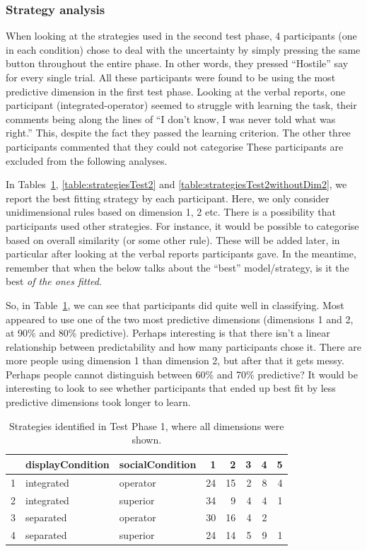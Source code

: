\documentclass[doc, a4paper, apacite]{apa6}
\begin{document}
\subsubsection{Strategy analysis}

When looking at the strategies used in the second test phase, 4 participants (one in each condition) chose to deal with the uncertainty by simply pressing the same button throughout the entire phase.
In other words, they pressed ``Hostile'' say for every single trial.
All these participants were found to be using the most predictive dimension in the first test phase. 
Looking at the verbal reports, one participant (integrated-operator) seemed to struggle with learning the task, their comments being along the lines of ``I don't know, I was never told what was right.''
This, despite the fact they passed the learning criterion. 
The other three participants commented that they could not categorise 
These participants are excluded from the following analyses. 

In Tables~\ref{table:strategiesTest1}, \ref{table:strategiesTest2} and \ref{table:strategiesTest2withoutDim2}, we report the best fitting strategy by each participant. 
Here, we only consider unidimensional rules based on dimension 1, 2 etc. 
There is a possibility that participants used other strategies. 
For instance, it would be possible to categorise based on overall similarity (or some other rule). 
These will be added later, in particular after looking at the verbal reports participants gave. 
In the meantime, remember that when the below talks about the ``best'' model/strategy, is it the best \emph{of the ones fitted}.

So, in Table~\ref{table:strategiesTest1}, we can see that participants did quite well in classifying. 
Most appeared to use one of the two most predictive dimensions (dimensions 1 and 2, at 90\% and 80\% predictive). 
Perhaps interesting is that there isn't a linear relationship between predictability and how many participants chose it. 
There are more people using dimension 1 than dimension 2, but after that it gets messy. 
Perhaps people cannot distinguish between 60\% and 70\% predictive? 
It would be interesting to look to see whether participants that ended up best fit by less predictive dimensions took longer to learn. 

\begin{table}
	\centering
	\caption{Strategies identified in Test Phase 1, where all dimensions were shown.}
	\label{table:strategiesTest1}
	\begin{tabular}{rllrrrrr}
	  \hline
	 & displayCondition & socialCondition & 1 & 2 & 3 & 4 & 5 \\ 
	  \hline
	1 & integrated & operator &  24 &  15 &   2 &   8 &   4 \\ 
	  2 & integrated & superior &  34 &   9 &   4 &   4 &   1 \\ 
	  3 & separated & operator &  30 &  16 &   4 &   2 &  \\ 
	  4 & separated & superior &  24 &  14 &   5 &   9 &   1 \\ 
	   \hline
	\end{tabular}
\end{table}
\end{document}
